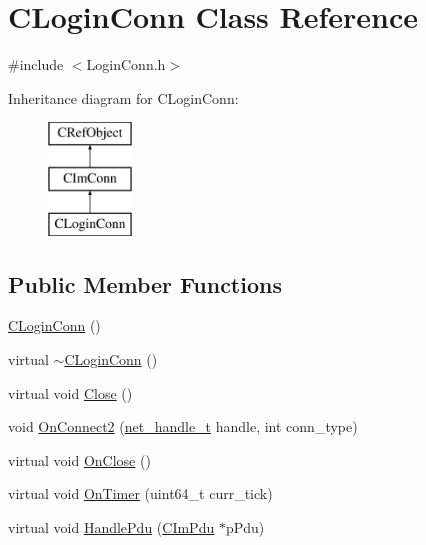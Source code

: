 \hypertarget{class_c_login_conn}{}\section{C\+Login\+Conn Class Reference}
\label{class_c_login_conn}


{\ttfamily \#include $<$Login\+Conn.\+h$>$}

Inheritance diagram for C\+Login\+Conn\+:\begin{figure}[H]
\begin{center}
\leavevmode
\includegraphics[height=3.000000cm]{class_c_login_conn}
\end{center}
\end{figure}
\subsection*{Public Member Functions}
\begin{DoxyCompactItemize}
\item 
\hyperlink{class_c_login_conn_a4720c34bef4c41b47b690d7585df6919}{C\+Login\+Conn} ()
\item 
virtual \hyperlink{class_c_login_conn_ae899e7dd636f93fa3fbe5a109c42c966}{$\sim$\+C\+Login\+Conn} ()
\item 
virtual void \hyperlink{class_c_login_conn_a9edc01bf40bfe2de0e6b9c4bd9168155}{Close} ()
\item 
void \hyperlink{class_c_login_conn_a2d1227fc795a310e860cdd60e067a64e}{On\+Connect2} (\hyperlink{base_2ostype_8h_a5e1697fa312aa00ac7305460abf166fd}{net\+\_\+handle\+\_\+t} handle, int conn\+\_\+type)
\item 
virtual void \hyperlink{class_c_login_conn_a48b818c098e560f36944c0f1c13f4660}{On\+Close} ()
\item 
virtual void \hyperlink{class_c_login_conn_a7490f9b6ae21ad0093659d26b0bd5f85}{On\+Timer} (uint64\+\_\+t curr\+\_\+tick)
\item 
virtual void \hyperlink{class_c_login_conn_a6fd3295bd543fba213e67cdc9e1266fb}{Handle\+Pdu} (\hyperlink{class_c_im_pdu}{C\+Im\+Pdu} $\ast$p\+Pdu)
\end{DoxyCompactItemize}
